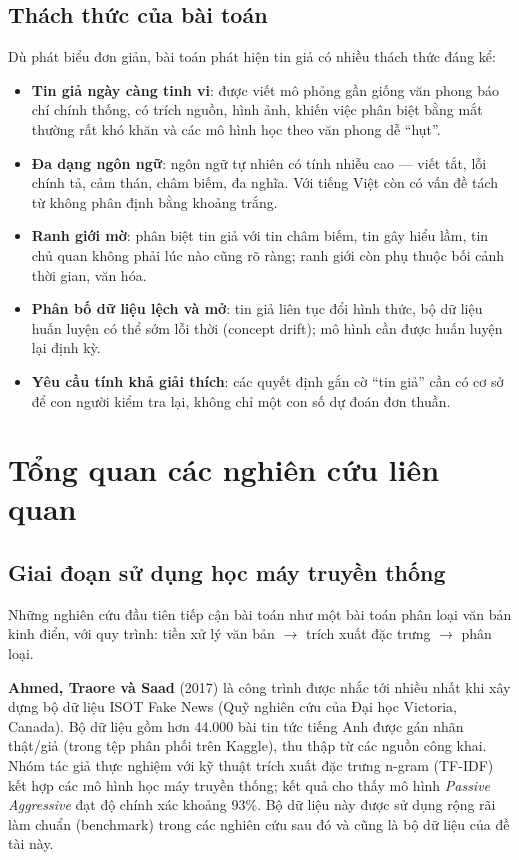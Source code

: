 \subsection{Thách thức của bài toán}

Dù phát biểu đơn giản, bài toán phát hiện tin giả có nhiều thách thức đáng kể:

\begin{itemize}
    \item \textbf{Tin giả ngày càng tinh vi}: được viết mô phỏng gần giống văn phong báo chí chính thống, có trích nguồn, hình ảnh, khiến việc phân biệt bằng mắt thường rất khó khăn và các mô hình học theo văn phong dễ ``hụt''.
    \item \textbf{Đa dạng ngôn ngữ}: ngôn ngữ tự nhiên có tính nhiễu cao --- viết tắt, lỗi chính tả, cảm thán, châm biếm, đa nghĩa. Với tiếng Việt còn có vấn đề tách từ không phân định bằng khoảng trắng.
    \item \textbf{Ranh giới mờ}: phân biệt tin giả với tin châm biếm, tin gây hiểu lầm, tin chủ quan không phải lúc nào cũng rõ ràng; ranh giới còn phụ thuộc bối cảnh thời gian, văn hóa.
    \item \textbf{Phân bố dữ liệu lệch và mở}: tin giả liên tục đổi hình thức, bộ dữ liệu huấn luyện có thể sớm lỗi thời (concept drift); mô hình cần được huấn luyện lại định kỳ.
    \item \textbf{Yêu cầu tính khả giải thích}: các quyết định gắn cờ ``tin giả'' cần có cơ sở để con người kiểm tra lại, không chỉ một con số dự đoán đơn thuần.
\end{itemize}

\section{Tổng quan các nghiên cứu liên quan}

\subsection{Giai đoạn sử dụng học máy truyền thống}

Những nghiên cứu đầu tiên tiếp cận bài toán như một bài toán phân loại văn bản kinh điển, với quy trình: tiền xử lý văn bản $\rightarrow$ trích xuất đặc trưng $\rightarrow$ phân loại.

\textbf{Ahmed, Traore và Saad} (2017) \cite{ahmed2017} là công trình được nhắc tới nhiều nhất khi xây dựng bộ dữ liệu ISOT Fake News (Quỹ nghiên cứu của Đại học Victoria, Canada). Bộ dữ liệu gồm hơn 44.000 bài tin tức tiếng Anh được gán nhãn thật/giả (trong tệp phân phối trên Kaggle), thu thập từ các nguồn công khai. Nhóm tác giả thực nghiệm với kỹ thuật trích xuất đặc trưng n-gram (TF-IDF) kết hợp các mô hình học máy truyền thống; kết quả cho thấy mô hình \textit{Passive Aggressive} đạt độ chính xác khoảng 93\%. Bộ dữ liệu này được sử dụng rộng rãi làm chuẩn (benchmark) trong các nghiên cứu sau đó và cũng là bộ dữ liệu của đề tài này.

